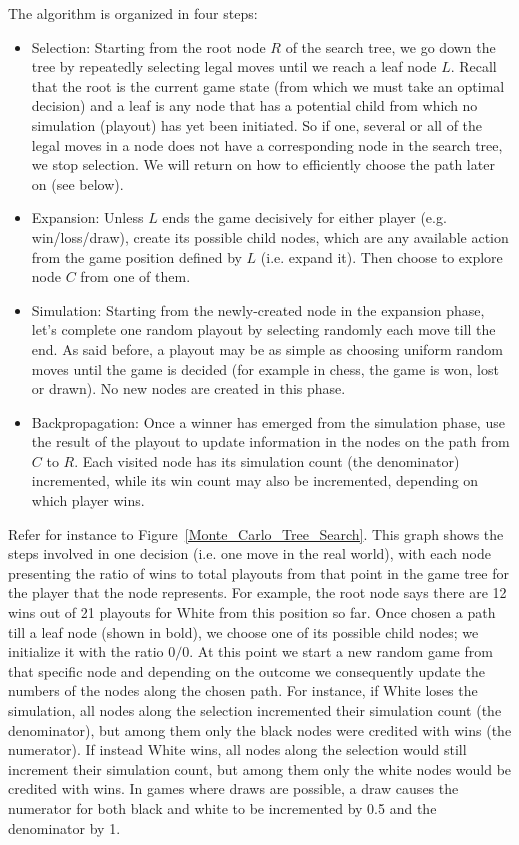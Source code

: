 The algorithm is organized in four steps:
\begin{itemize}
\item Selection: Starting from the root node $R$ of the search tree, we go down the tree by repeatedly selecting legal moves until we reach a leaf node $L$. Recall that the root is the current game state (from which we must take an optimal decision) and a leaf is any node that has a potential child from which no simulation (playout) has yet been initiated. So if one, several or all of the legal moves in a node does not have a corresponding node in the search tree, we stop selection. We will return on how to efficiently choose the path later on (see below).
\item Expansion: Unless $L$ ends the game decisively for either player (e.g. win/loss/draw), create its possible child nodes, which are any available action from the game position defined by $L$ (i.e. expand it). Then choose to explore node $C$ from one of them.
\item Simulation: Starting from the newly-created node in the expansion phase, let's complete one random playout by selecting randomly each move till the end. As said before, a playout may be as simple as choosing uniform random moves until the game is decided (for example in chess, the game is won, lost or drawn). No new nodes are created in this phase.
\item Backpropagation: Once a winner has emerged from the simulation phase, use the result of the playout to update information in the nodes on the path from $C$ to $R$. Each visited node has its simulation count (the denominator) incremented, while its win count may also be incremented, depending on which player wins.
\end{itemize}
Refer for instance to Figure~\ref{Monte_Carlo_Tree_Search}. This graph shows the steps involved in one decision (i.e. one move in the real world), with each node presenting the ratio of wins to total playouts from that point in the game tree for the player that the node represents. For example, the root node says there are 12 wins out of 21 playouts for White from this position so far.
Once chosen a path till a leaf node (shown in bold), we choose one of its possible child nodes; we initialize it with the ratio $0/0$. At this point we start a new random game from that specific node and depending on the outcome we consequently update the numbers of the nodes along the chosen path. For instance, if White loses the simulation, all nodes along the selection incremented their simulation count (the denominator), but among them only the black nodes were credited with wins (the numerator). If instead White wins, all nodes along the selection would still increment their simulation count, but among them only the white nodes would be credited with wins. In games where draws are possible, a draw causes the numerator for both black and white to be incremented by 0.5 and the denominator by 1.
